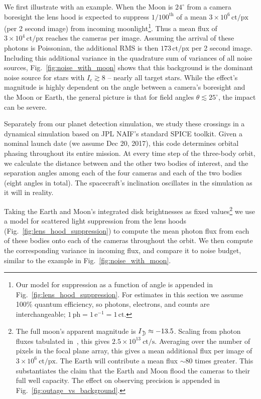 We first illustrate with an example.
When the Moon is $24^\circ$ from a camera boresight the lens hood 
is expected to suppress $1/100^\mathrm{th}$ of a mean 
$3\times10^6\,\mathrm{ct/px}$ (per 2 second image) from incoming 
moonlight\footnote{Our model for suppression as a function of angle is 
appended in Fig.~\ref{fig:lens_hood_suppression}. For estimates in this section 
we assume 
100\% quantum efficiency, so photons, electrons, and counts are 
interchangeable; 
$1\,\mathrm{ph} = 1\,\mathrm{e^{-1}} = 1\,\mathrm{ct}$.}.
Thus a mean flux of $3\times10^4\,\mathrm{ct/px}$ reaches the cameras per 
image. 
Assuming the arrival of these photons is Poissonian, the additional RMS is 
then $173\,\mathrm{ct/px}$ per 2 second image.
Including this additional variance in the quadrature sum of variances of all 
noise sources, Fig.~\ref{fig:noise_with_moon} shows that this background 
is the dominant noise source for stars with $I_c \gtrsim 8$ -- nearly all 
target stars.
While the effect's magnitude is highly dependent on the angle between a 
camera's
boresight and the Moon or Earth, the general picture is that for field angles 
$\theta \lesssim25^{\circ}$, the impact can be severe.

Separately from our planet detection simulation, we study these 
crossings in a dynamical simulation based on JPL NAIF's standard SPICE toolkit.
Given a nominal launch date (we assume Dec 20, 2017), this code determines 
\tesss orbital phasing throughout its entire mission. 
At every time step of the three-body orbit, we calculate the distance between 
\tess and the other two bodies of interest, and the separation angles among 
each of the four cameras and each of the two bodies (eight angles in total). 
The spacecraft's inclination oscillates in the simulation as it will in 
reality.

Taking the Earth and Moon's integrated disk brightnesses as fixed 
values\footnote{The full moon's apparent magnitude is $I_\moon \approx -13.5$. 
Scaling from photon fluxes tabulated in~\citet{winn_photonflux_2013}, this 
gives $2.5\times10^{13}\ \mathrm{ct/s}$. Averaging over the number of pixels 
in the focal plane array, 
this gives a mean additional flux per image of $3\times10^6\ \mathrm{ct/px}$.
The Earth will contribute a mean flux $\sim {80}$ times greater.
This substantiates the claim that the Earth and Moon flood the cameras to 
their full well capacity. 
The effect on observing precision is appended in 
Fig.~\ref{fig:outage_vs_background}.} we use a model for scattered light 
suppression from 
the \tess lens hoods (Fig.~\ref{fig:lens_hood_suppression}) to compute the 
mean photon flux from each of these bodies onto each of the cameras throughout 
the orbit. We then compute the corresponding variance in incoming flux, and 
compare it to \tesss noise budget, similar to the example in 
Fig.~\ref{fig:noise_with_moon}.

